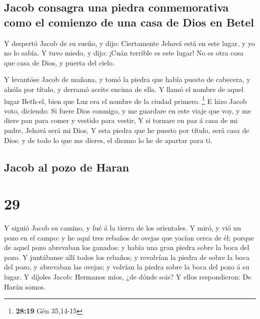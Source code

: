 \hypertarget{jacob-consagra-una-piedra-conmemorativa-como-el-comienzo-de-una-casa-de-dios-en-betel}{%
\subsection{Jacob consagra una piedra conmemorativa como el comienzo de
una casa de Dios en
Betel}\label{jacob-consagra-una-piedra-conmemorativa-como-el-comienzo-de-una-casa-de-dios-en-betel}}

 Y despertó Jacob de su sueño, y dijo: Ciertamente Jehová
está en este lugar, y yo no lo sabía.  Y tuvo miedo, y
dijo: ¡Cuán terrible es este lugar! No es otra cosa que casa de Dios, y
puerta del cielo.

 Y levantóse Jacob de mañana, y tomó la piedra que había
puesto de cabecera, y alzóla por título, y derramó aceite encima de
ella.  Y llamó el nombre de aquel lugar Beth-el, bien que
Luz era el nombre de la ciudad primero. \footnote{\textbf{28:19} Gén
  35,14-15}  E hizo Jacob voto, diciendo: Si fuere Dios
conmigo, y me guardare en este viaje que voy, y me diere pan para comer
y vestido para vestir,  Y si tornare en paz á casa de mi
padre, Jehová será mi Dios,  Y esta piedra que he puesto
por título, será casa de Dios: y de todo lo que me dieres, el diezmo lo
he de apartar para ti.

\hypertarget{jacob-al-pozo-de-haran}{%
\subsection{Jacob al pozo de Haran}\label{jacob-al-pozo-de-haran}}

\hypertarget{section-28}{%
\section{29}\label{section-28}}

 Y siguió Jacob su camino, y fué á la tierra de los
orientales.  Y miró, y vió un pozo en el campo: y he aquí
tres rebaños de ovejas que yacían cerca de él; porque de aquel pozo
abrevaban los ganados: y había una gran piedra sobre la boca del pozo.
 Y juntábanse allí todos los rebaños; y revolvían la piedra
de sobre la boca del pozo, y abrevaban las ovejas; y volvían la piedra
sobre la boca del pozo á su lugar.  Y díjoles Jacob:
Hermanos míos, ¿de dónde sois? Y ellos respondieron: De Harán somos.

